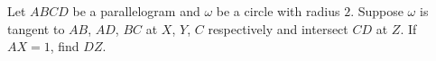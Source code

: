 Let $ABCD$ be a parallelogram and $\omega$ be a circle with radius $2$. Suppose $\omega$ is tangent to $AB$, $AD$, $BC$ at $X$, $Y$, $C$ respectively and intersect $CD$ at $Z$. If $AX=1$, find $DZ$.
